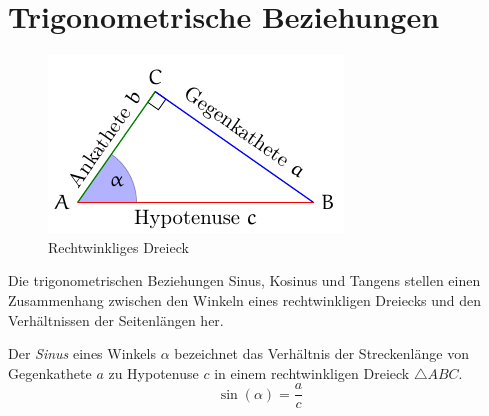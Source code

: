 \begin{folg}
 
\end{folg}

\begin{folg}
 
\end{folg}

\begin{folg}
 
\end{folg}

\begin{folg}
 
\end{folg}

\begin{folg}
 
\end{folg}


\section{Trigonometrische Beziehungen}

\begin{figure}\begin{center}
                \includegraphics[width=.6\textwidth]{./rechtwinkliges_dreieck.pdf}

                \end{center}
\caption{Rechtwinkliges Dreieck}
\end{figure}

Die trigonometrischen Beziehungen Sinus, Kosinus und Tangens stellen einen Zusammenhang zwischen den Winkeln eines rechtwinkligen Dreiecks und den Verhältnissen der Seitenlängen her.

\begin{defi}[Sinus]
 Der \emph{Sinus} eines Winkels \(\alpha\) bezeichnet das Verhältnis der Streckenlänge von Gegenkathete \(a\) zu Hypotenuse \(c\) in einem rechtwinkligen Dreieck \(\triangle ABC\).
 \begin{equation*}
  \sin (\alpha ) = \frac{a}{c}
 \end{equation*}

\end{defi}

